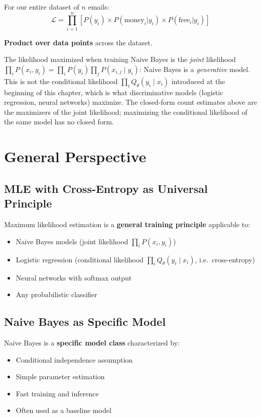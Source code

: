 \begin{notechapter}
For our entire dataset of $n$ emails:
\[
\mathcal{L} = \prod_{i=1}^n \left[ P(y_i) \times P(\text{money}_i|y_i) \times P(\text{free}_i|y_i) \right]
\]

\textbf{Product over data points} across the dataset.

\begin{remark}
The likelihood maximized when training Naive Bayes is the \emph{joint} likelihood \( \prod_i P(x_i, y_i) = \prod_i P(y_i)\prod_j P(x_{i,j}\mid y_i) \): Naive Bayes is a \emph{generative} model. This is not the conditional likelihood \( \prod_i Q_\theta(y_i\mid x_i) \) introduced at the beginning of this chapter, which is what discriminative models (logistic regression, neural networks) maximize. The closed-form count estimates above are the maximizers of the joint likelihood; maximizing the conditional likelihood of the same model has no closed form.
\end{remark}

\section{General Perspective}

\subsection{MLE with Cross-Entropy as Universal Principle}

Maximum likelihood estimation is a \textbf{general training principle} applicable to:

\begin{itemize}
        \item Naive Bayes models (joint likelihood \( \prod_i P(x_i, y_i) \))
    \item Logistic regression (conditional likelihood \( \prod_i Q_\theta(y_i \mid x_i) \), i.e.\ cross-entropy)
    \item Neural networks with softmax output
    \item Any probabilistic classifier
\end{itemize}

\subsection{Naive Bayes as Specific Model}

Naive Bayes is a \textbf{specific model class} characterized by:
\begin{itemize}
    \item Conditional independence assumption
    \item Simple parameter estimation
    \item Fast training and inference
    \item Often used as a baseline model
\end{itemize}


\end{notechapter}
